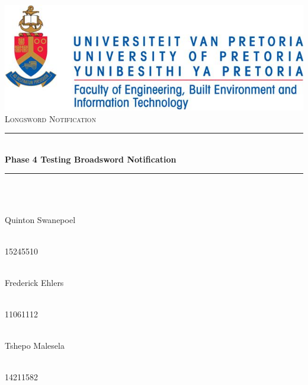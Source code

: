 \begin{titlepage}
	
	\begin{center}
		\includegraphics[width=0.7\linewidth]{Images/uniLogo.jpg}\\[1cm]    
		\textsc{\LARGE Longsword Notification}\\[0.3cm]
		\rule{\linewidth}{0.5mm} \\[1cm]
		{ \huge \bfseries Phase 4 Testing Broadsword Notification}\\[0.5cm]
		\rule{\linewidth}{0.5mm} \\[1cm] 		
  
		\begin{minipage}{0.5\textwidth}
			\begin{flushleft} \large
				\emph{} \\
				Quinton {Swanepoel}
			\end{flushleft}
		\end{minipage}
		\begin{minipage}{0.4\textwidth}
			\begin{flushright} \large
				\emph{} \\
				15245510
			\end{flushright}
		\end{minipage}
		
		\begin{minipage}{0.5\textwidth}
			\begin{flushleft} \large
				\emph{} \\
				Frederick {Ehlers}
			\end{flushleft}
		\end{minipage}
		\begin{minipage}{0.4\textwidth}
			\begin{flushright} \large
				\emph{} \\
				11061112
			\end{flushright}
		\end{minipage}
		
		\begin{minipage}{0.5\textwidth}
			\begin{flushleft} \large
				\emph{} \\
				Tshepo {Malesela}
			\end{flushleft}
		\end{minipage}
		\begin{minipage}{0.4\textwidth}
			\begin{flushright} \large
				\emph{} \\
				14211582
			\end{flushright}
		\end{minipage}


\end{center}
\end{titlepage}
